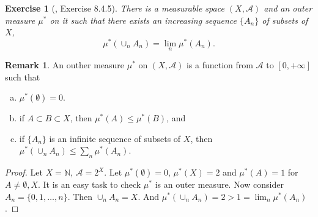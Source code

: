 \documentclass[11pt]{article}
\theoremstyle{plain}
\newtheorem{exercise}{Exercise}
\theoremstyle{definition}
\newtheorem{remark}{Remark}
\theoremstyle{remark}
\begin{document}
\begin{exercise}[\cite{book:992991}, Exercise 8.4.5]
    There is a measurable space $(X, \mathscr A)$ and an outer measure $\mu^*$ on it such that there exists an increasing sequence $\{A_n\}$ of subsets of $X$,
    \begin{equation*}
        \mu^* ( \cup_n A_n )  = \lim_n \mu^* (A_n).
    \end{equation*}
\end{exercise}
\begin{remark}
    An outher measure $\mu^*$ on $(X, \mathscr A)$ is a function from $\mathscr A$ to $[0, +\infty]$ such that
    \begin{enumerate}[(a)]
    \item 
        $\mu^* (\emptyset ) = 0$.
    \item
        if $A\subset B \subset X$, then $ \mu^* (A) \leq \mu^* (B)$, and
    \item
        if $\{A_n\}$ is an infinite sequence of subsets of $X$, then $\mu^* (\cup_n A_n) \leq \sum_n \mu^* (A_n)$.
\end{enumerate}
\end{remark}
\begin{proof}
    Let $X = \mathbb N$, $\mathscr A = 2^X$.
    Let $\mu^* (\emptyset) = 0$, $\mu^* (X) =2$ and $\mu^* (A)=1$ for $A \neq \emptyset, X$.
    It is an easy task to check $\mu^* $ is an outer measure.
    Now consider $A_n =\{0,1,\dots,n\}$.
    Then $\cup_n A_n = X$.
    And $\mu^* (\cup_n A_n) = 2 > 1 = \lim_n \mu^* (A_n)$.
\end{proof}
\end{document}
